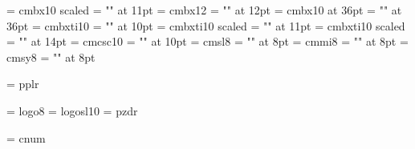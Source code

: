 \font\enelevenbf = cmbx10 scaled \magstephalf
\font\zhelevenbf = "\hei" at 11pt
\def\elevenbf{\enelevenbf\letfont\zhelevenbf}
\font\entwelvebf = cmbx12
\font\zhtwelvebf = "\hei" at 12pt
\def\twelvebf{\entwelvebf\letfont\zhtwelvebf}
\font\enthirtysixbf = cmbx10 at 36pt
\font\zhthirtysixbf = "\hei" at 36pt
\def\thirtysixbf{\enthirtysixbf\letfont\zhthirtysixbf}
%
\font\entenbi = cmbxti10
\font\zhtenbi = "\hei" at 10pt
\def\tenbi{\entenbi\letfont\zhtenbi}
\font\enelevenbi= cmbxti10 scaled \magstephalf
\font\zhelevenbi = "\hei" at 11pt
\def\elevenbi{\enelevenbi\letfont\zhelevenbi}
\font\enfourteenbi= cmbxti10 scaled 
\font\zhfourteenbi = "\hei" at 14pt
\def\fourteenbi{\enfourteenbi\letfont\zhfourteenbi}
%
\font\entensc = cmcsc10
\font\zhtensc = "\fang" at 10pt
\def\tensc{\entensc\letfont\zhtensc}
\font\eneightsl = cmsl8
\font\zheightsl = "\fang" at 8pt
\def\eightsl{\eneightsl\letfont\zheightsl}
\font\eneighti = cmmi8
\font\zheighti = "\kai" at 8pt
\def\eighti{\eneighti\letfont\zheighti}
\font\eneightsy = cmsy8
\font\zheightsy = "\song" at 8pt
\def\eightsy{\eneightsy\letfont\zheightsy}

 
%
\font\tenpal = pplr

% 
\font\eightlogo = logo8
\font\logosl = logosl10
\font\handfont = pzdr

\ifmsdos
   \font\cnum = cnum %
   \let\chapternumeralfont = \cnum
\fi

\def\undefinedfont{\errmessage{Undefined font}}

% 
\def\clearfonts{\let\rm = \undefinedfont \let\bf = \undefinedfont
   \let\it = \undefinedfont \let\bi = \undefinedfont
   \let\tt = \undefinedfont \let\bt = \undefinedfont
   \let\sc = \undefinedfont
   \let\ss = \undefinedfont
}

